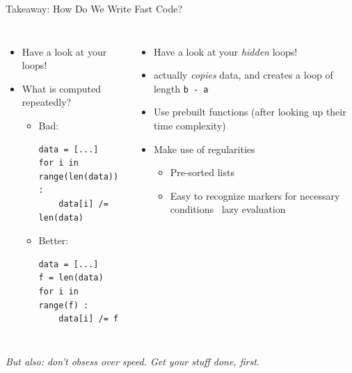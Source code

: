 
\begin{frame}[fragile]{Takeaway: How Do We Write Fast Code?}
%
\begin{columns}[T]
\begin{itemize}
\item Have a look at your loops!
\item What is computed repeatedly?
	\begin{itemize}
	\item Bad:
	\begin{verbatim}
data = [...]
for i in range(len(data)) :
    data[i] /= len(data)
	\end{verbatim}
	
	\item Better:
	\begin{verbatim}
data = [...]
f = len(data)
for i in range(f) :
    data[i] /= f
	\end{verbatim}
	
	\end{itemize}
\end{itemize}
%
\begin{itemize}
\item Have a look at your \emph{hidden} loops!
\item {} actually \emph{copies} data, and creates a loop of length \texttt{b - a}
\item Use prebuilt functions (after looking up their time complexity)
\item Make use of regularities
	\begin{itemize}
	\item Pre-sorted lists
	\item Easy to recognize markers for necessary conditions \Thus\, lazy evaluation
	\end{itemize}
\end{itemize}
\end{columns}
%
\begin{center}
\emph{But also: don't obsess over speed. Get your stuff done, first.}
\end{center}
%
\end{frame}


